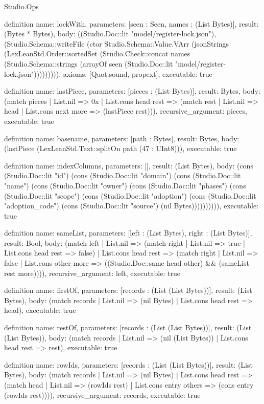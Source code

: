 \begin{lexlean}{Studio.Ops}
\begin{semanticmodule}
definition{
  name: lockWith,
  parameters: [seen : Seen, names : (List Bytes)],
  result: (Bytes * Bytes),
  body: ((Studio.Doc::lit "model/register-lock.json"), (Studio.Schema::writeFile (ctor Studio.Schema::Value.VArr (jsonStrings (LexLeanStd.Order::sortedSet (Studio.Check::concat names (Studio.Schema::strings (arrayOf seen (Studio.Doc::lit "model/register-lock.json"))))))))),
  axioms: [Quot.sound, propext],
  executable: true
}



definition{
  name: lastPiece,
  parameters: [pieces : (List Bytes)],
  result: Bytes,
  body: (match pieces
    | List.nil => 0x
    | List.cons head rest => (match rest
      | List.nil => head
      | List.cons next more => (lastPiece rest))),
  recursive_argument: pieces,
  executable: true
}

definition{
  name: basename,
  parameters: [path : Bytes],
  result: Bytes,
  body: (lastPiece (LexLeanStd.Text::splitOn path (47 : UInt8))),
  executable: true
}


definition{
  name: indexColumns,
  parameters: [],
  result: (List Bytes),
  body: (cons (Studio.Doc::lit "id") (cons (Studio.Doc::lit "domain") (cons (Studio.Doc::lit "name") (cons (Studio.Doc::lit "owner") (cons (Studio.Doc::lit "phases") (cons (Studio.Doc::lit "scope") (cons (Studio.Doc::lit "adoption") (cons (Studio.Doc::lit "adoption_code") (cons (Studio.Doc::lit "source") (nil Bytes)))))))))),
  executable: true
}


definition{
  name: sameList,
  parameters: [left : (List Bytes), right : (List Bytes)],
  result: Bool,
  body: (match left
    | List.nil => (match right
      | List.nil => true
      | List.cons head rest => false)
    | List.cons head rest => (match right
      | List.nil => false
      | List.cons other more => ((Studio.Doc::same head other) && (sameList rest more)))),
  recursive_argument: left,
  executable: true
}


definition{
  name: firstOf,
  parameters: [records : (List (List Bytes))],
  result: (List Bytes),
  body: (match records
    | List.nil => (nil Bytes)
    | List.cons head rest => head),
  executable: true
}


definition{
  name: restOf,
  parameters: [records : (List (List Bytes))],
  result: (List (List Bytes)),
  body: (match records
    | List.nil => (nil (List Bytes))
    | List.cons head rest => rest),
  executable: true
}

definition{
  name: rowIds,
  parameters: [records : (List (List Bytes))],
  result: (List Bytes),
  body: (match records
    | List.nil => (nil Bytes)
    | List.cons head rest => (match head
      | List.nil => (rowIds rest)
      | List.cons entry others => (cons entry (rowIds rest)))),
  recursive_argument: records,
  executable: true
}



\end{semanticmodule}
\end{lexlean}
